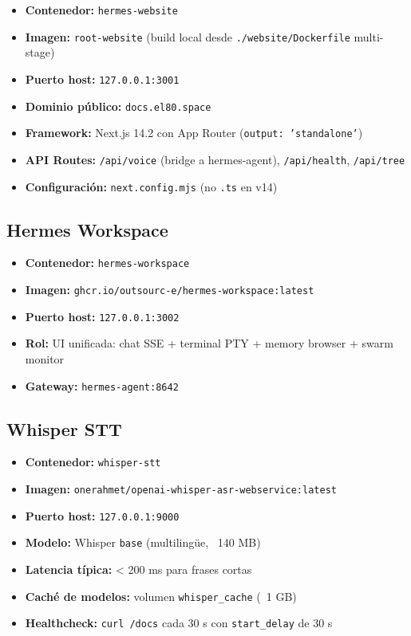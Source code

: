 \documentclass[11pt,a4paper]{article}
\newcommand{\dato}[2]{\textbf{\color{hermesblue}#1:} #2}
\begin{document}
\begin{itemize}[leftmargin=*,itemsep=1pt]
\item \dato{Contenedor}{\texttt{hermes-website}}
\item \dato{Imagen}{\texttt{root-website} (build local desde \texttt{./website/Dockerfile} multi-stage)}
\item \dato{Puerto host}{\texttt{127.0.0.1:3001}}
\item \dato{Dominio público}{\texttt{docs.el80.space}}
\item \dato{Framework}{Next.js 14.2 con App Router (\texttt{output: 'standalone'})}
\item \dato{API Routes}{\texttt{/api/voice} (bridge a hermes-agent), \texttt{/api/health}, \texttt{/api/tree}}
\item \dato{Configuración}{\texttt{next.config.mjs} (no \texttt{.ts} en v14)}
\end{itemize}

\subsection{Hermes Workspace}

\begin{itemize}[leftmargin=*,itemsep=1pt]
\item \dato{Contenedor}{\texttt{hermes-workspace}}
\item \dato{Imagen}{\texttt{ghcr.io/outsourc-e/hermes-workspace:latest}}
\item \dato{Puerto host}{\texttt{127.0.0.1:3002}}
\item \dato{Rol}{UI unificada: chat SSE + terminal PTY + memory browser + swarm monitor}
\item \dato{Gateway}{\texttt{hermes-agent:8642}}
\end{itemize}

\subsection{Whisper STT}

\begin{itemize}[leftmargin=*,itemsep=1pt]
\item \dato{Contenedor}{\texttt{whisper-stt}}
\item \dato{Imagen}{\texttt{onerahmet/openai-whisper-asr-webservice:latest}}
\item \dato{Puerto host}{\texttt{127.0.0.1:9000}}
\item \dato{Modelo}{Whisper \texttt{base} (multilingüe, ~140 MB)}
\item \dato{Latencia típica}{< 200 ms para frases cortas}
\item \dato{Caché de modelos}{volumen \texttt{whisper\_cache} (~1 GB)}
\item \dato{Healthcheck}{\texttt{curl /docs} cada 30 s con \texttt{start\_delay} de 30 s}
\end{itemize}
\end{document}
